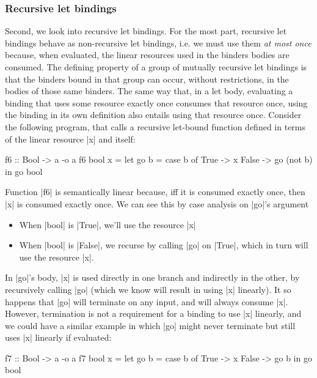 \documentclass[acmsmall, screen, review]{acmart}
\begin{document}
\subsubsection{Recursive let bindings\label{sec:semantic-linearity-examples:recursive-lets}}
Second, we look into recursive let bindings. For the most part,
recursive let bindings behave as non-recursive let bindings, i.e. we must use them \emph{at
most once} because, when evaluated, the linear resources used in the binders
bodies are consumed. The defining property of a group of mutually recursive let
bindings is that the binders bound in that group can occur, without restrictions, in
the bodies of those same binders. The same way that, in a let body, evaluating
a binding that uses some resource exactly once consumes that resource once,
using the binding in its own definition also entails using that resource once.
Consider the following program, that calls a recursive let-bound function
defined in terms of the linear resource |x| and itself:
%
\begin{notyet}
\begin{code}
f6 :: Bool -> a -o a
f6 bool x =
  let go b
        = case b of
           True -> x
           False -> go (not b)
  in go bool
\end{code}
\end{notyet}
%
Function |f6| is semantically linear because, iff it is consumed exactly once,
then |x| is consumed exactly once. We can see this by case analysis on |go|'s argument
\begin{itemize}
\item When |bool| is |True|, we'll use the resource |x|
\item When |bool| is |False|, we recurse by calling |go| on |True|, which in turn will use the resource |x|.
\end{itemize}
In |go|'s body, |x| is used directly in one branch and indirectly in the
other, by recursively calling |go| (which we know will result in using |x|
linearly).
%
It so happens that |go| will terminate on any input, and will always consume
|x|. However, termination is not a requirement for a binding to use |x| linearly,
and we could have a similar example in which |go| might never terminate but still
uses |x| linearly if evaluated:
%
\begin{notyet}
\begin{code}
f7 :: Bool -> a -o a
f7 bool x =
  let go b
        = case b of
           True -> x
           False -> go b
  in go bool
\end{code}
\end{notyet}
\end{document}
